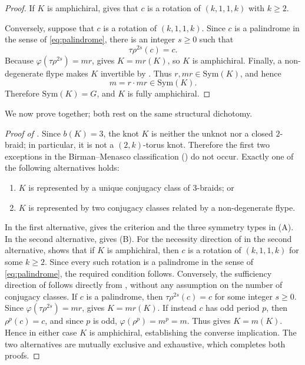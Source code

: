 \documentclass[11pt]{article}
\theoremstyle{definition}
\begin{document}
\begin{proof}
If $K$ is amphichiral,  gives that $c$ is a
rotation of $(k,1,1,k)$ with $k\ge2$.

Conversely, suppose that $c$ is a rotation of $(k,1,1,k)$. Since $c$ is
a palindrome in the sense of \eqref{eq:palindrome}, there is an integer
$s\ge0$ such that
\[
\tau\rho^{2s}(c)=c.
\]
Because $\varphi(\tau\rho^{2s})=mr$,  gives
$K=mr(K)$, so $K$ is amphichiral. Finally, a non-degenerate flype makes
$K$ invertible by . Thus $r,mr\in\mathrm{Sym}(K)$, and
hence
\[
m=r\cdot mr\in\mathrm{Sym}(K).
\]
Therefore $\mathrm{Sym}(K)=G$, and $K$ is fully amphichiral.
\end{proof}

\noindent We now prove  together; both rest on the same
structural dichotomy.

\begin{proof}[Proof of ]
Since $b(K)=3$, the knot $K$ is neither the unknot nor a closed $2$-braid;
in particular, it is not a $(2,k)$-torus knot. Therefore the first two
exceptions in the Birman--Menasco classification () do not
occur. Exactly one of the following alternatives holds:
\begin{enumerate}[label=\textup{(\roman*)}]
\item $K$ is represented by a unique conjugacy class of $3$-braids; or
\item $K$ is represented by two conjugacy classes related by a
non-degenerate flype.
\end{enumerate}
In the first alternative,  gives the criterion and the three symmetry types in (A). In the second alternative,  gives (B). For the necessity direction of  in the second alternative,  shows that if $K$ is amphichiral, then $c$ is a rotation of $(k,1,1,k)$ for some $k\ge2$. Since every such rotation is a palindrome in the sense of \eqref{eq:palindrome}, the required condition follows. Conversely, the sufficiency direction of  follows directly from , without any assumption on the number of conjugacy classes. If $c$ is a palindrome, then $\tau\rho^{2s}(c)=c$ for some integer $s\ge0$. Since $\varphi(\tau\rho^{2s})=mr$,  gives $K=mr(K)$. If instead $c$ has odd period $p$, then $\rho^p(c)=c$, and since $p$ is odd, $\varphi(\rho^p)=m^p=m$. Thus  gives $K=m(K)$. Hence in either case $K$ is amphichiral, establishing the converse implication. The two alternatives are mutually exclusive and exhaustive, which completes both proofs.
\end{proof}
\end{document}
